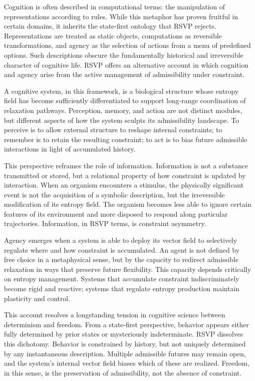 \documentclass[11pt,oneside]{book}
\begin{document}
Cognition is often described in computational terms: the manipulation of representations according to rules. While this metaphor has proven fruitful in certain domains, it inherits the state-first ontology that RSVP rejects. Representations are treated as static objects, computations as reversible transformations, and agency as the selection of actions from a menu of predefined options. Such descriptions obscure the fundamentally historical and irreversible character of cognitive life. RSVP offers an alternative account in which cognition and agency arise from the active management of admissibility under constraint.

A cognitive system, in this framework, is a biological structure whose entropy field has become sufficiently differentiated to support long-range coordination of relaxation pathways. Perception, memory, and action are not distinct modules, but different aspects of how the system sculpts its admissibility landscape. To perceive is to allow external structure to reshape internal constraints; to remember is to retain the resulting constraint; to act is to bias future admissible interactions in light of accumulated history.

This perspective reframes the role of information. Information is not a substance transmitted or stored, but a relational property of how constraint is updated by interaction. When an organism encounters a stimulus, the physically significant event is not the acquisition of a symbolic description, but the irreversible modification of its entropy field. The organism becomes less able to ignore certain features of its environment and more disposed to respond along particular trajectories. Information, in RSVP terms, is constraint asymmetry.

Agency emerges when a system is able to deploy its vector field to selectively regulate where and how constraint is accumulated. An agent is not defined by free choice in a metaphysical sense, but by the capacity to redirect admissible relaxation in ways that preserve future flexibility. This capacity depends critically on entropy management. Systems that accumulate constraint indiscriminately become rigid and reactive; systems that regulate entropy production maintain plasticity and control.

This account resolves a longstanding tension in cognitive science between determinism and freedom. From a state-first perspective, behavior appears either fully determined by prior states or mysteriously indeterminate. RSVP dissolves this dichotomy. Behavior is constrained by history, but not uniquely determined by any instantaneous description. Multiple admissible futures may remain open, and the system’s internal vector field biases which of these are realized. Freedom, in this sense, is the preservation of admissibility, not the absence of constraint.
\end{document}

